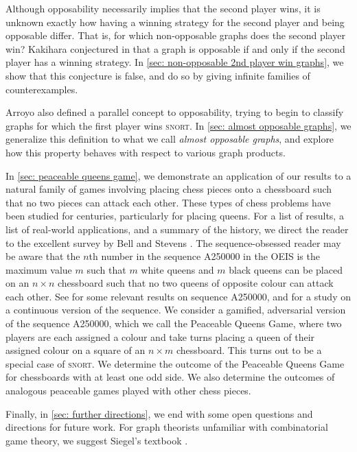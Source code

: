 \documentclass[11pt]{article}
\theoremstyle{definition}
\begin{document}
Although opposability necessarily implies that the second player wins, it is
unknown exactly how having a winning strategy for the second player and being
opposable differ. That is, for which non-opposable graphs does the second
player win? Kakihara conjectured in \cite{kakihara:snort} that a graph is
opposable if and only if the second player has a winning strategy. In
\cref{sec: non-opposable 2nd player win graphs}, we show that this conjecture
is false, and do so by giving infinite families of counterexamples.

Arroyo \cite{arroyo:dawsons} also defined a parallel concept to opposability,
trying to begin to classify graphs for which the first player wins
\textsc{snort}. In \cref{sec: almost opposable graphs}, we generalize this
definition to what we call \emph{almost opposable graphs}, and explore how this
property behaves with respect to various graph products.

In \cref{sec: peaceable queens game}, we demonstrate an application of our
results to a natural family of games involving placing chess pieces onto a
chessboard such that no two pieces can attack each other. These types of chess
problems have been studied for centuries, particularly for placing queens. For
a list of results, a list of real-world applications, and a summary of the
history, we direct the reader to the excellent survey by Bell and Stevens
\cite{bell.stevens:survey}. The sequence-obsessed reader may be aware that the
$n$th number in the sequence A250000 in the OEIS is the maximum value $m$ such
that $m$ white queens and $m$ black queens can be placed on an $n\times n$
chessboard such that no two queens of opposite colour can attack each other.
See \cite{sloane:on-line} for some relevant results on sequence A250000, and
\cite{yao.zeilberger:numerical} for a study on a continuous version of the
sequence. We consider a gamified, adversarial version of the sequence A250000,
which we call the Peaceable Queens Game, where two players are each assigned a
colour and take turns placing a queen of their assigned colour on a square of
an $n\times m$ chessboard. This turns out to be a special case of
\textsc{snort}. We determine the outcome of the Peaceable Queens Game for
chessboards with at least one odd side. We also determine the outcomes of
analogous peaceable games played with other chess pieces.

Finally, in \cref{sec: further directions}, we end with some open questions and
directions for future work. For graph theorists unfamiliar with combinatorial
game theory, we suggest Siegel's textbook \cite{siegel:combinatorial}.
\end{document}
